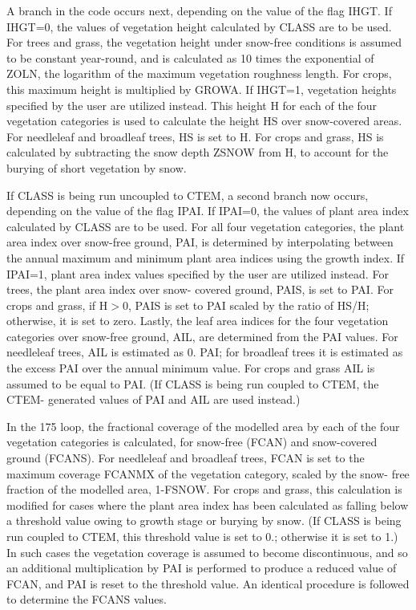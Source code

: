 A branch in the code occurs next, depending on the value of the flag I\+H\+G\+T. If I\+H\+G\+T=0, the values of vegetation height calculated by C\+L\+A\+S\+S are to be used. For trees and grass, the vegetation height under snow-\/free conditions is assumed to be constant year-\/round, and is calculated as 10 times the exponential of Z\+O\+L\+N, the logarithm of the maximum vegetation roughness length. For crops, this maximum height is multiplied by G\+R\+O\+W\+A. If I\+H\+G\+T=1, vegetation heights specified by the user are utilized instead. This height H for each of the four vegetation categories is used to calculate the height H\+S over snow-\/covered areas. For needleleaf and broadleaf trees, H\+S is set to H. For crops and grass, H\+S is calculated by subtracting the snow depth Z\+S\+N\+O\+W from H, to account for the burying of short vegetation by snow.

If C\+L\+A\+S\+S is being run uncoupled to C\+T\+E\+M, a second branch now occurs, depending on the value of the flag I\+P\+A\+I. If I\+P\+A\+I=0, the values of plant area index calculated by C\+L\+A\+S\+S are to be used. For all four vegetation categories, the plant area index over snow-\/free ground, P\+A\+I, is determined by interpolating between the annual maximum and minimum plant area indices using the growth index. If I\+P\+A\+I=1, plant area index values specified by the user are utilized instead. For trees, the plant area index over snow-\/ covered ground, P\+A\+I\+S, is set to P\+A\+I. For crops and grass, if H$>$0, P\+A\+I\+S is set to P\+A\+I scaled by the ratio of H\+S/\+H; otherwise, it is set to zero. Lastly, the leaf area indices for the four vegetation categories over snow-\/free ground, A\+I\+L, are determined from the P\+A\+I values. For needleleaf trees, A\+I\+L is estimated as 0. P\+A\+I; for broadleaf trees it is estimated as the excess P\+A\+I over the annual minimum value. For crops and grass A\+I\+L is assumed to be equal to P\+A\+I. (If C\+L\+A\+S\+S is being run coupled to C\+T\+E\+M, the C\+T\+E\+M-\/ generated values of P\+A\+I and A\+I\+L are used instead.)

In the 175 loop, the fractional coverage of the modelled area by each of the four vegetation categories is calculated, for snow-\/free (F\+C\+A\+N) and snow-\/covered ground (F\+C\+A\+N\+S). For needleleaf and broadleaf trees, F\+C\+A\+N is set to the maximum coverage F\+C\+A\+N\+M\+X of the vegetation category, scaled by the snow-\/ free fraction of the modelled area, 1-\/\+F\+S\+N\+O\+W. For crops and grass, this calculation is modified for cases where the plant area index has been calculated as falling below a threshold value owing to growth stage or burying by snow. (If C\+L\+A\+S\+S is being run coupled to C\+T\+E\+M, this threshold value is set to 0.; otherwise it is set to 1.) In such cases the vegetation coverage is assumed to become discontinuous, and so an additional multiplication by P\+A\+I is performed to produce a reduced value of F\+C\+A\+N, and P\+A\+I is reset to the threshold value. An identical procedure is followed to determine the F\+C\+A\+N\+S values.

